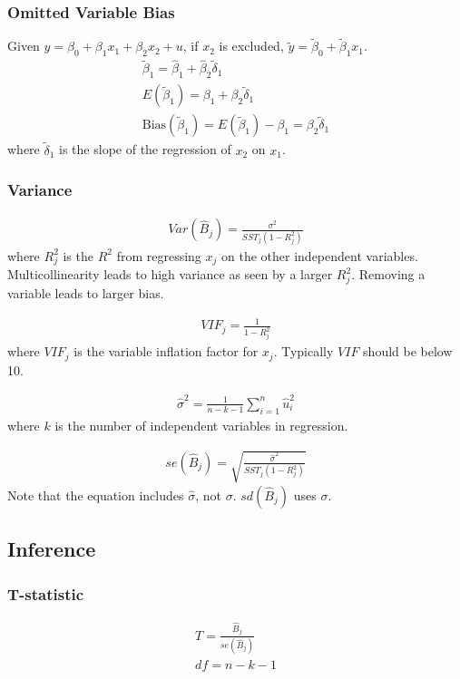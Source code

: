 \documentclass[12pt]{article}
\numberwithin{equation}{section}
\begin{document}
\subsubsection{Omitted Variable Bias}
Given $y = \beta_0 + \beta_1 x_1 + \beta_2 x_2 + u$, if $x_2$ is excluded, $\tilde{y} = \tilde{\beta}_0 + \tilde{\beta}_1 x_1$.
\begin{gather}
    \tilde{\beta}_1 = \hat{\beta}_1 + \hat{\beta}_2 \tilde{\delta}_1 \\
    E(\tilde{\beta}_1) = \beta_1 + \beta_2 \tilde{\delta}_1 \\
    \text{Bias}(\tilde{\beta}_1) = E(\tilde{\beta}_1) - \beta_1 = \beta_2 \tilde{\delta}_1
\end{gather}
where $\tilde{\delta}_1$ is the slope of the regression of $x_2$ on $x_1$.

\subsubsection{Variance}
\begin{gather}
    Var(\hat{B}_j) = \frac{\sigma^2}{SST_j(1-R_j^2)}
\end{gather}
where $R_j^2$ is the $R^2$ from regressing $x_j$ on the other independent variables.\\[0.5cm]
Multicollinearity leads to high variance as seen by a larger $R_j^2$. Removing a variable leads to larger bias.

\begin{gather}
    VIF_j = \frac{1}{1-R_j^2}
\end{gather}
where $VIF_j$ is the variable inflation factor for $x_j$. Typically $VIF$ should be below 10.

\begin{gather}
    \hat{\sigma}^2 = \frac{1}{n-k-1} \sum_{i=1}^{n} \hat{u}_i^2
\end{gather}
where $k$ is the number of independent variables in regression.

\begin{gather}
    se(\hat{B}_j) = \sqrt{\frac{\hat{\sigma}^2}{SST_j(1-R_j^2)}}
\end{gather}
Note that the equation includes $\hat{\sigma}$, not $\sigma$. $sd(\hat{B}_j)$ uses $\sigma$.

\subsection{Inference}

\subsubsection{T-statistic}
\begin{gather}
    T = \frac{\hat{B}_j}{se(\hat{B}_j)} \\
    df = n-k-1
\end{gather}
\end{document}
